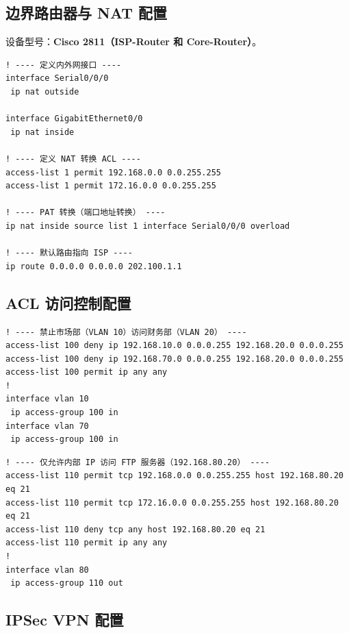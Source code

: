 \documentclass[12pt,a4paper]{ctexart}
\begin{document}
\subsection{边界路由器与 NAT 配置}

设备型号：\textbf{Cisco 2811（ISP-Router 和 Core-Router）}。

\begin{lstlisting}[caption={NAT 配置（Core-Router）}, label={lst:nat}]
! ---- 定义内外网接口 ----
interface Serial0/0/0
 ip nat outside

interface GigabitEthernet0/0
 ip nat inside

! ---- 定义 NAT 转换 ACL ----
access-list 1 permit 192.168.0.0 0.0.255.255
access-list 1 permit 172.16.0.0 0.0.255.255

! ---- PAT 转换（端口地址转换） ----
ip nat inside source list 1 interface Serial0/0/0 overload

! ---- 默认路由指向 ISP ----
ip route 0.0.0.0 0.0.0.0 202.100.1.1
\end{lstlisting}

\subsection{ACL 访问控制配置}

\begin{lstlisting}[caption={ACL 配置 — 部门间访问控制}, label={lst:acl-dept}]
! ---- 禁止市场部（VLAN 10）访问财务部（VLAN 20） ----
access-list 100 deny ip 192.168.10.0 0.0.0.255 192.168.20.0 0.0.0.255
access-list 100 deny ip 192.168.70.0 0.0.0.255 192.168.20.0 0.0.0.255
access-list 100 permit ip any any
!
interface vlan 10
 ip access-group 100 in
interface vlan 70
 ip access-group 100 in
\end{lstlisting}

\begin{lstlisting}[caption={ACL 配置 — FTP 访问控制}, label={lst:acl-ftp}]
! ---- 仅允许内部 IP 访问 FTP 服务器（192.168.80.20） ----
access-list 110 permit tcp 192.168.0.0 0.0.255.255 host 192.168.80.20 eq 21
access-list 110 permit tcp 172.16.0.0 0.0.255.255 host 192.168.80.20 eq 21
access-list 110 deny tcp any host 192.168.80.20 eq 21
access-list 110 permit ip any any
!
interface vlan 80
 ip access-group 110 out
\end{lstlisting}

\subsection{IPSec VPN 配置}
\end{document}
